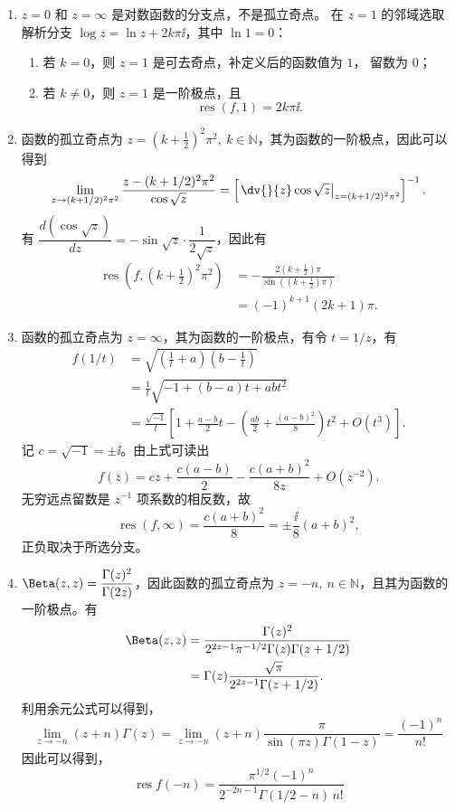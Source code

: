 \begin{question}
\begin{solution}
\begin{enumerate}
  \item \(z=0\) 和 \(z=\infty\) 是对数函数的分支点，不是孤立奇点。
  在 \(z=1\) 的邻域选取解析分支
  \(\log z=\ln z+2k\pi\ii\)，其中 \(\ln1=0\)：
  \begin{enumerate}
    \item 若 \(k=0\)，则 \(z=1\) 是可去奇点，补定义后的函数值为 \(1\)，
    留数为 \(0\)；
    \item 若 \(k\ne0\)，则 \(z=1\) 是一阶极点，且
    \[
    \operatorname{res}(f,1)=2k\pi\ii.
    \]
  \end{enumerate}

  \item 函数的孤立奇点为 \(z=(k+\frac12)^2\pi^2,\ k\in\mathbb{N}\)，其为函数的一阶极点，因此可以得到
\[
\lim_{z\to(k+1/2)^2\pi^2}
\frac{z-(k+1/2)^2\pi^2}{\cos\sqrt{z}}
=
\left[
\left.\dv{}{z}\cos\sqrt z\right|_{z=(k+1/2)^2\pi^2}
\right]^{-1}.
\]
有 \(\dfrac{d(\cos\sqrt{z})}{dz}=-\sin\sqrt{z}\cdot\dfrac1{2\sqrt{z}}\)，因此有
\[
\begin{aligned}
\operatorname{res}\left(f,(k+\tfrac12)^2\pi^2\right)
&=-\frac{2(k+\frac12)\pi}{\sin((k+\frac12)\pi)}\\
&=(-1)^{k+1}(2k+1)\pi.
\end{aligned}
\]

  \item 函数的孤立奇点为 \(z=\infty\)，其为函数的一阶极点，有令 \(t=1/z\)，有
\[
\begin{aligned}
f(1/t)
&=\sqrt{\left(\frac1t+a\right)\left(b-\frac1t\right)}\\
&=\frac1t\sqrt{-1+(b-a)t+abt^2}\\
&=\frac{\sqrt{-1}}{t}
\left[1+\frac{a-b}{2}t
-\left(\frac{ab}{2}+\frac{(a-b)^2}{8}\right)t^2+O(t^3)\right].
\end{aligned}
\]
记 \(c=\sqrt{-1}=\pm\ii\)。由上式可读出
\[
f(z)=cz+\frac{c(a-b)}2-\frac{c(a+b)^2}{8z}
+O(z^{-2}).
\]
无穷远点留数是 \(z^{-1}\) 项系数的相反数，故
\[
\operatorname{res}(f,\infty)
=\frac{c(a+b)^2}{8}
=\pm\frac{\ii}{8}(a+b)^2,
\]
正负取决于所选分支。

  \item \(\Beta(z,z)=\dfrac{\Gamma(z)^2}{\Gamma(2z)}\)，因此函数的孤立奇点为 \(z=-n,\ n\in\mathbb{N}\)，且其为函数的一阶极点。有
\[
\begin{aligned}
\Beta(z,z)
&=\frac{\Gamma(z)^2}
{2^{2z-1}\pi^{-1/2}\Gamma(z)\Gamma(z+1/2)}\\
&=\Gamma(z)\frac{\sqrt{\pi}}
{2^{2z-1}\Gamma(z+1/2)}.
\end{aligned}
\]
利用余元公式可以得到，
\[
\lim_{z\to -n}(z+n)\Gamma(z)=\lim_{z\to -n}(z+n)\frac{\pi}{\sin(\pi z)\Gamma(1-z)}=\frac{(-1)^n}{n!}
\]
因此可以得到，
\[
\operatorname{res}f(-n)=\frac{\pi^{1/2}(-1)^n}{2^{-2n-1}\Gamma(1/2-n)\,n!}
\]
\end{enumerate}
\end{solution}
\end{question}

